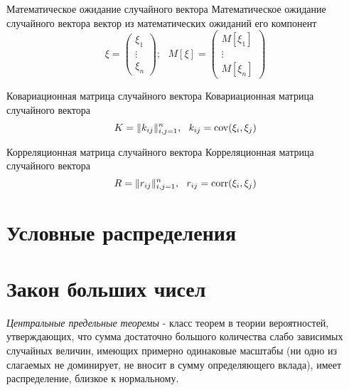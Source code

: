 \documentclass[12pt]{article}
\begin{document}
\begin{definition}
    {Математическое ожидание случайного вектора}
    {Математическое ожидание случайного вектора}
    вектор из математических ожиданий его компонент
    \begin{displaymath}
        \xi=\left(
            \begin{array}{c} \xi_{1} \\ \vdots \\ \xi_{n} \end{array}
        \right);
        \ \ \ M[\xi]=\left(
            \begin{array}{c} M[\xi_{1}] \\ \vdots \\ M[\xi_{n}]\end{array}
        \right)
    \end{displaymath}
\end{definition}

\begin{definition}
    {Ковариационная матрица случайного вектора}
    {Ковариационная матрица случайного вектора}
    \begin{displaymath}
        K=\|k_{ij}\|_{i,j=1}^{n},\ \ k_{ij}=\textmd{cov}(\xi_{i},\xi_{j})
    \end{displaymath}
\end{definition}

\begin{definition}
    {Корреляционная матрица случайного вектора}
    {Корреляционная матрица случайного вектора}
    \begin{displaymath}
        R=\|r_{ij}\|_{i,j=1}^{n},\ \ r_{ij}=\textmd{corr}(\xi_{i},\xi_{j})
    \end{displaymath}
\end{definition}

\newpage
\section{Условные распределения}

\newpage \section{Закон больших чисел}
\textit{Центральные предельные
теоремы} - класс теорем в теории
вероятностей, утверждающих, что сумма достаточно большого количества
слабо зависимых случайных величин, имеющих примерно одинаковые масштабы
(ни одно из слагаемых не доминирует, не вносит в сумму определяющего
вклада), имеет распределение, близкое к нормальному.
\end{document}
